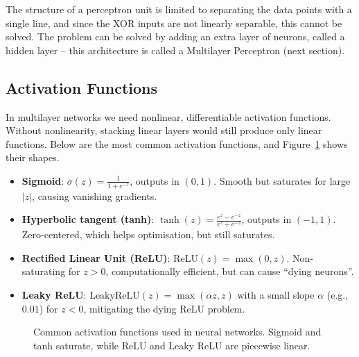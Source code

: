 \documentclass{tufte-handout}
\begin{document}
The structure of a perceptron unit is limited to separating the data points with a single line, and since the XOR inputs are not linearly separable, this cannot be solved. The problem can be solved by adding an extra layer of neurons, called a hidden layer – this architecture is called a Multilayer Perceptron (next section).

\subsection{Activation Functions}

In multilayer networks we need nonlinear, differentiable activation functions. Without nonlinearity, stacking linear layers would still produce only linear functions. Below are the most common activation functions, and Figure~\ref{fig:activations} shows their shapes.

\begin{itemize}
    \item \textbf{Sigmoid}: $\sigma(z) = \frac{1}{1+e^{-z}}$, outputs in $(0,1)$. Smooth but saturates for large $|z|$, causing vanishing gradients.
    \item \textbf{Hyperbolic tangent (tanh)}: $\tanh(z) = \frac{e^{z}-e^{-z}}{e^{z}+e^{-z}}$, outputs in $(-1,1)$. Zero-centered, which helps optimisation, but still saturates.
    \item \textbf{Rectified Linear Unit (ReLU)}: $\text{ReLU}(z) = \max(0,z)$. Non-saturating for $z>0$, computationally efficient, but can cause “dying neurons”.
    \item \textbf{Leaky ReLU}: $\text{LeakyReLU}(z) = \max(\alpha z, z)$ with a small slope $\alpha$ (e.g., $0.01$) for $z<0$, mitigating the dying ReLU problem.
\end{itemize}

\begin{figure}[h]
\centering
{}
\caption{Common activation functions used in neural networks. Sigmoid and tanh saturate, while ReLU and Leaky ReLU are piecewise linear.}
\label{fig:activations}
\end{figure}
\end{document}
